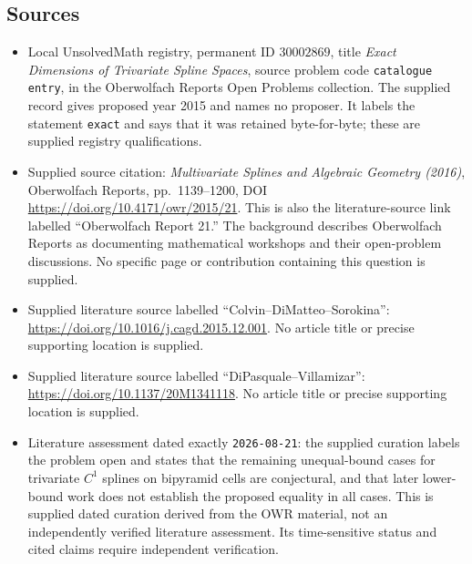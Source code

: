 \documentclass[11pt]{article}
\begin{document}
\subsection{Sources}
\begin{itemize}
\item Local UnsolvedMath registry, permanent ID \(30002869\), title \emph{Exact Dimensions of Trivariate Spline Spaces}, source problem code \texttt{catalogue entry}, in the Oberwolfach Reports Open Problems collection. The supplied record gives proposed year 2015 and names no proposer. It labels the statement \texttt{exact} and says that it was retained byte-for-byte; these are supplied registry qualifications.
\item Supplied source citation: \emph{Multivariate Splines and Algebraic Geometry (2016)}, Oberwolfach Reports, pp.\ 1139--1200, DOI \url{https://doi.org/10.4171/owr/2015/21}. This is also the literature-source link labelled ``Oberwolfach Report 21.'' The background describes Oberwolfach Reports as documenting mathematical workshops and their open-problem discussions. No specific page or contribution containing this question is supplied.
\item Supplied literature source labelled ``Colvin--DiMatteo--Sorokina'': \url{https://doi.org/10.1016/j.cagd.2015.12.001}. No article title or precise supporting location is supplied.
\item Supplied literature source labelled ``DiPasquale--Villamizar'': \url{https://doi.org/10.1137/20M1341118}. No article title or precise supporting location is supplied.
\item Literature assessment dated exactly \texttt{2026-08-21}: the supplied curation labels the problem open and states that the remaining unequal-bound cases for trivariate \(C^1\) splines on bipyramid cells are conjectural, and that later lower-bound work does not establish the proposed equality in all cases. This is supplied dated curation derived from the OWR material, not an independently verified literature assessment. Its time-sensitive status and cited claims require independent verification.
\end{itemize}
\end{document}
